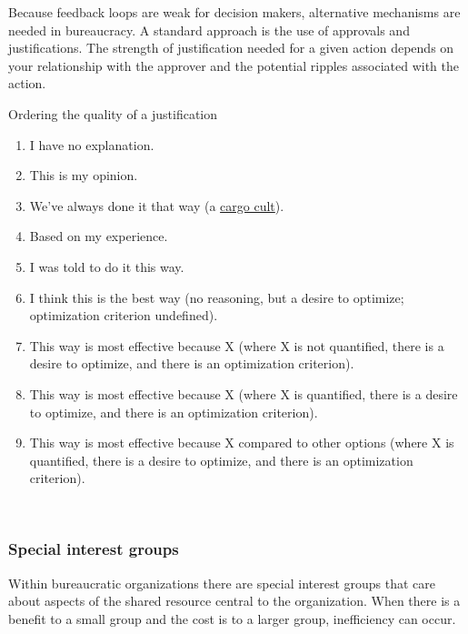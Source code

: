 Because feedback loops are weak for decision makers, alternative mechanisms are needed in bureaucracy. A standard approach is the use of approvals and justifications. The strength of justification needed for a given action depends on your relationship with the approver and the potential ripples associated with the action. 

Ordering the quality of a justification
\begin{enumerate}
    \item I have no explanation.
    \item This is my opinion.
    \item We've always done it that way (a \href{https://en.wikipedia.org/wiki/Cargo_cult}{cargo cult}).
    \item Based on my experience.
    \item I was told to do it this way.
    \item I think this is the best way (no reasoning, but a desire to optimize; optimization criterion undefined).
    \item This way is most effective because X (where X is not quantified, there is a desire to optimize, and there is an optimization criterion).
    \item This way is most effective because X (where X is quantified, there is a desire to optimize, and there is an optimization criterion).
    \item This way is most effective because X compared to other options (where X is quantified, there is a desire to optimize, and there is an optimization criterion).
\end{enumerate}


\ \\



\subsubsection*{Special interest groups}

Within bureaucratic organizations there are special interest groups that care about aspects of the shared resource central to the organization. 
When there is a benefit to a small group and the cost is to a larger group, inefficiency can occur.

